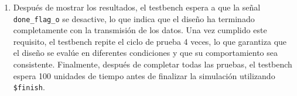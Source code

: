 \begin{adjustwidth}{1.5cm}{}
\begin{enumerate}
    \item Después de mostrar los resultados, el testbench espera a que la señal \texttt{done\_flag\_o} se desactive, lo que indica que el diseño ha terminado completamente con la transmisión de los datos. Una vez cumplido este requisito, el testbench repite el ciclo de prueba 4 veces, lo que garantiza que el diseño se evalúe en diferentes condiciones y que su comportamiento sea consistente. Finalmente, después de completar todas las pruebas, el testbench espera 100 unidades de tiempo antes de finalizar la simulación utilizando  \texttt{\$finish}.
\end{enumerate}
\end{adjustwidth}

\vspace{0.4em} %

